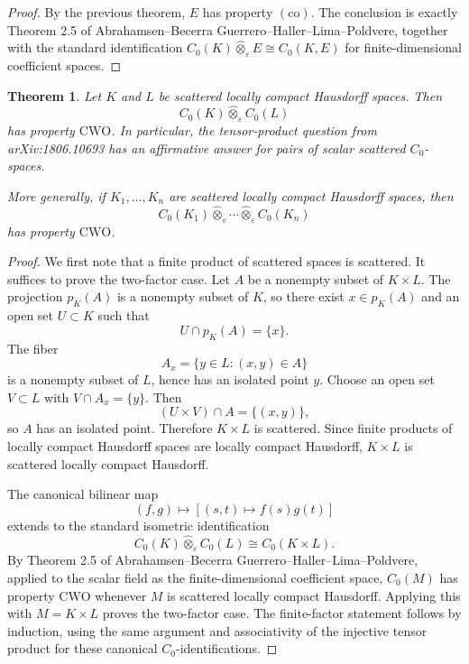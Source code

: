 \documentclass[11pt]{article}
\newtheorem{theorem}{Theorem}
\newcommand{\CWO}{\mathrm{CWO}}
\newcommand{\co}{\mathrm{(co)}}
\newcommand{\eps}{\varepsilon}
\begin{document}
\begin{proof}
By the previous theorem, \(E\) has property \(\co\). The conclusion is
exactly Theorem 2.5 of Abrahamsen--Becerra Guerrero--Haller--Lima--Poldvere,
together with the standard identification
\(C_0(K)\widehat{\otimes}_{\eps}E\cong C_0(K,E)\) for finite-dimensional
coefficient spaces.
\end{proof}

\begin{theorem}
Let \(K\) and \(L\) be scattered locally compact Hausdorff spaces. Then
\[
  C_0(K)\widehat{\otimes}_{\eps} C_0(L)
\]
has property \(\CWO\). In particular, the tensor-product question from
arXiv:1806.10693 has an affirmative answer for pairs of scalar scattered
\(C_0\)-spaces.

More generally, if \(K_1,\ldots,K_n\) are scattered locally compact Hausdorff
spaces, then
\[
  C_0(K_1)\widehat{\otimes}_{\eps}\cdots
  \widehat{\otimes}_{\eps} C_0(K_n)
\]
has property \(\CWO\).
\end{theorem}

\begin{proof}
We first note that a finite product of scattered spaces is scattered. It
suffices to prove the two-factor case. Let \(A\) be a nonempty subset of
\(K\times L\). The projection \(p_K(A)\) is a nonempty subset of \(K\), so
there exist \(x\in p_K(A)\) and an open set \(U\subset K\) such that
\[
  U\cap p_K(A)=\{x\}.
\]
The fiber
\[
  A_x=\{y\in L:(x,y)\in A\}
\]
is a nonempty subset of \(L\), hence has an isolated point \(y\). Choose an
open set \(V\subset L\) with \(V\cap A_x=\{y\}\). Then
\[
  (U\times V)\cap A=\{(x,y)\},
\]
so \(A\) has an isolated point. Therefore \(K\times L\) is scattered. Since
finite products of locally compact Hausdorff spaces are locally compact
Hausdorff, \(K\times L\) is scattered locally compact Hausdorff.

The canonical bilinear map
\[
  (f,g)\mapsto [(s,t)\mapsto f(s)g(t)]
\]
extends to the standard isometric identification
\[
  C_0(K)\widehat{\otimes}_{\eps}C_0(L)\cong C_0(K\times L).
\]
By Theorem 2.5 of Abrahamsen--Becerra Guerrero--Haller--Lima--Poldvere,
applied to the scalar field as the finite-dimensional coefficient space,
\(C_0(M)\) has property \(\CWO\) whenever \(M\) is scattered locally compact
Hausdorff. Applying this with \(M=K\times L\) proves the two-factor case.
The finite-factor statement follows by induction, using the same argument
and associativity of the injective tensor product for these canonical
\(C_0\)-identifications.
\end{proof}
\end{document}
